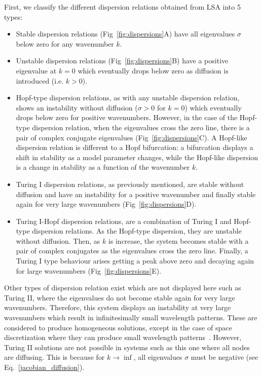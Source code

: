 First, we classify the different dispersion relations obtained from LSA into 5 types:
\begin{itemize}
    \item Stable dispersion relations (Fig~\ref{fig:dispersions}A) have all eigenvalues $\sigma$ below zero for any wavenumber $k$.
    \item Unstable dispersion relations (Fig~\ref{fig:dispersions}B) have a positive eigenvalue at $k=0$ which eventually drops below zero as diffusion is introduced (i.e. $k>0$).
    \item Hopf-type dispersion relations, as with any unstable dispersion relation, shows an instability without diffusion ($\sigma>0$ for $k=0$) which eventually drops below zero for positive wavenumbers.
However, in the case of the Hopf-type dispersion relation, when the eigenvalues cross the zero line, there is a pair of complex conjugate eigenvalues (Fig~\ref{fig:dispersions}C).
A Hopf-like dispersion relation is different to a Hopf bifurcation: a bifurcation displays a shift in stability as a model parameter changes, while the Hopf-like dispersion is a change in stability as a function of the wavenumber $k$.
\item Turing I dispersion relations, as previously mentioned, are stable without diffusion and have an instability for a positive wavenumber and finally stable again for very large wavenumbers (Fig~\ref{fig:dispersions}D).
    \item Turing I-Hopf dispersion relations, are a combination of Turing I and Hopf-type dispersion relations.
As the Hopf-type dispersion, they are unstable without diffusion.
Then, as $k$ is increase, the system becomes stable with a pair of complex conjugates as the eigenvalues cross the zero line.
Finally, a Turing I type behaviour arises getting a peak above zero and decaying again for large wavenumbers (Fig~\ref{fig:dispersions}E).
\end{itemize}
Other types of dispersion relation exist which are not displayed here such as Turing II, where the eigenvalues do not become stable again for very large wavenumbers.
Therefore, this system displays an instability at very large wavenumbers which result in infinitesimally small wavelength patterns.
These are considered to produce homogeneous solutions, except in the case of space discretization where they can produce small wavelength patterns~\parencite{Wang2022}.
However, Turing II solutions are not possible in systems such as this one where all nodes are diffusing.
This is because for $k \rightarrow \inf$, all eigenvalues $\sigma$ must be negative (see Eq.~\ref{jacobian_diffusion}).

